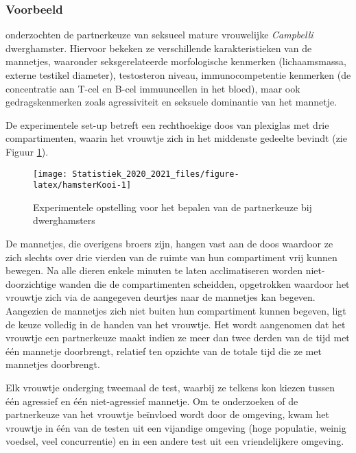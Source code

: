 \documentclass[
  12pt,dutch,coursenotes]{book}
\theoremstyle{definition}
\theoremstyle{definition}
\theoremstyle{definition}
\theoremstyle{remark}
\begin{document}
\hypertarget{voorbeeld}{%
\subsubsection{Voorbeeld}\label{voorbeeld}}

\citet{Rogovin2017} onderzochten de partnerkeuze van seksueel mature vrouwelijke \emph{Campbelli} dwerghamster.
Hiervoor bekeken ze verschillende karakteristieken van de mannetjes, waaronder seksgerelateerde morfologische kenmerken (lichaamsmassa, externe testikel diameter), testosteron niveau, immunocompetentie kenmerken (de concentratie aan T-cel en B-cel immuuncellen in het bloed), maar ook gedragskenmerken zoals agressiviteit en seksuele dominantie van het mannetje.

De experimentele set-up betreft een rechthoekige doos van plexiglas met drie compartimenten, waarin het vrouwtje zich in het middenste gedeelte bevindt (zie Figuur \ref{fig:hamsterKooi}).

\begin{figure}

{\centering \texttt{[image: Statistiek\_2020\_2021\_files/figure-latex/hamsterKooi-1]} 

}

\caption{Experimentele opstelling voor het bepalen van de partnerkeuze bij dwerghamsters}\label{fig:hamsterKooi}
\end{figure}

De mannetjes, die overigens broers zijn, hangen vast aan de doos waardoor ze zich slechts over drie vierden van de ruimte van hun compartiment vrij kunnen bewegen. Na alle dieren enkele minuten te laten acclimatiseren worden niet-doorzichtige wanden die de compartimenten scheidden, opgetrokken waardoor het vrouwtje zich via de aangegeven deurtjes naar de mannetjes kan begeven. Aangezien de mannetjes zich niet buiten hun compartiment kunnen begeven, ligt de keuze volledig in de handen van het vrouwtje. Het wordt aangenomen dat het vrouwtje een partnerkeuze maakt indien ze meer dan twee derden van de tijd met één mannetje doorbrengt, relatief ten opzichte van de totale tijd die ze met mannetjes doorbrengt.

Elk vrouwtje onderging tweemaal de test, waarbij ze telkens kon kiezen tussen één agressief en één niet-agressief mannetje. Om te onderzoeken of de partnerkeuze van het vrouwtje beïnvloed wordt door de omgeving, kwam het vrouwtje in één van de testen uit een vijandige omgeving (hoge populatie, weinig voedsel, veel concurrentie) en in een andere test uit een vriendelijkere omgeving.
\end{document}
